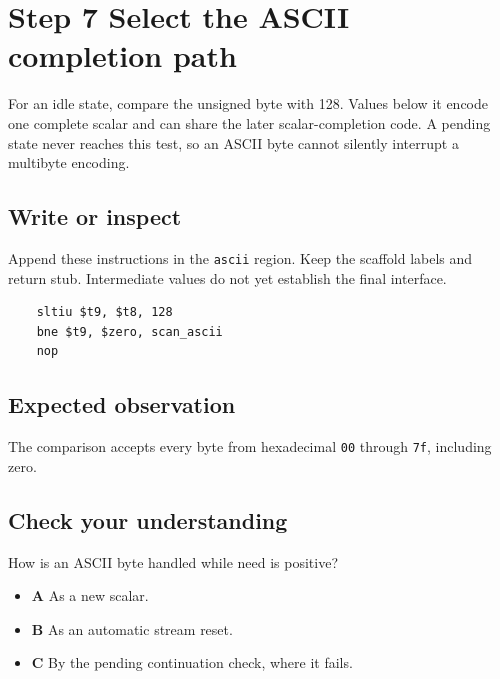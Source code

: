 \section{Step 7 Select the ASCII completion path}\label{utf8-s07}

For an idle state, compare the unsigned byte with 128. Values below it encode one complete scalar and can share the later scalar-completion code. A pending state never reaches this test, so an ASCII byte cannot silently interrupt a multibyte encoding.

\subsection{Write or inspect}
Append these instructions in the \texttt{ascii} region. Keep the scaffold labels and return stub. Intermediate values do not yet establish the final interface.

\begin{verbatim}
    sltiu $t9, $t8, 128
    bne $t9, $zero, scan_ascii
    nop
\end{verbatim}

\subsection{Expected observation}
The comparison accepts every byte from hexadecimal \texttt{00} through \texttt{7f}, including zero.

\subsection{Check your understanding}
How is an ASCII byte handled while need is positive?

\begin{itemize}
  \item \textbf{A} As a new scalar.
  \item \textbf{B} As an automatic stream reset.
  \item \textbf{C} By the pending continuation check, where it fails.
\end{itemize}
